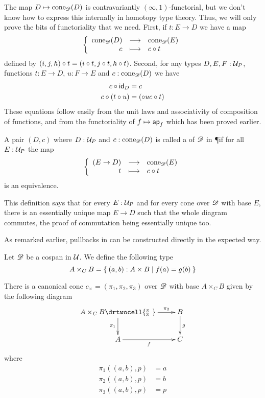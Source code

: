 The map $D\mapsto\cone{\Ddiag}{D}$ is contravariantly $(\infty,1)$-functorial, but we don't know how to express this internally in homotopy type theory.
Thus, we will only prove the bits of functoriality that we need.
First, if $t:E\to{}D$ we have a map
\[\function{\cone{\Ddiag}{D}}{\cone{\Ddiag}{E}}{c}{\composecone{t}{c}}\]
defined by $\composecone{t}{(i,j,h)}=(i\circ{}t,j\circ{}t,h\circ{}t)$.
Second, for any types $D,E,F:\P$, functions $t:E\to{}D$, $u:F\to{}E$ and
$c:\cone{\Ddiag}{D}$ we have
\begin{align*}
\composecone{\idfunc[D]}c &= c\\
\composecone{(t\circ{}u)}c &= \composecone{u}(\composecone{t}c)
\end{align*}
These equations follow easily from the unit laws and associativity of composition of
functions, and from the functoriality of $f\mapsto{}\mapfunc{f}$ which has been proved earlier.

\begin{defn}
  A pair $(D,c)$ where $D:\P$ and $c:\cone{\Ddiag}{D}$ is called a
   of $\Ddiag$ in \P if for all $E:\P$ the map
  \[\function{(E\to{}D)}{\cone{\Ddiag}{E}}{t}{\composecone{t}{c}}\]
  is an equivalence.
\end{defn}

This definition says that for every $E:\P$ and for every cone over $\Ddiag$
with base $E$, there is an essentially unique map $E\to{}D$ such that the whole
diagram commutes, the proof of commutation being essentially unique too.

As remarked earlier, pullbacks in \type can be constructed directly in the expected way.

\begin{defn}
  Let $\Ddiag$ be a cospan in $\type$. We define the following type
  \[A\times_CB=\setof{(a,b):A\times{}B | f(a) = g(b)}\]

  There is a canonical cone $c_\times=(\pi_1,\pi_2,\pi_3)$ over $\Ddiag$ with
  base $A\times_CB$ given by the following diagram
  \[\uppercurveobject{{ }}\lowercurveobject{{ }}\twocellhead{{ }}
  \xymatrix{A\times_CB \ar^-{\pi_2}[r] \ar_{\pi_1}[d] \drtwocell{^\pi_3\ }
    & B \ar^g[d] \\ A \ar_f[r] & C}\]
  where
  \begin{align*}
    \pi_1((a,b),p)&=a\\
    \pi_2((a,b),p)&=b\\
    \pi_3((a,b),p)&=p\\
  \end{align*}
\end{defn}

